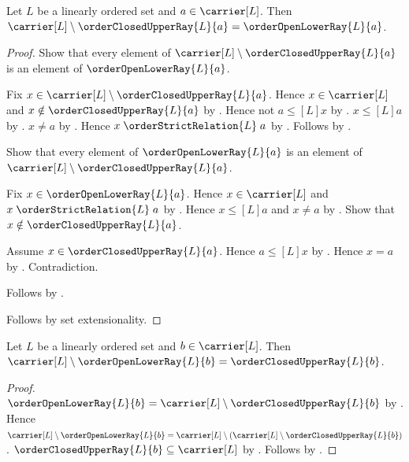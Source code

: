 \begin{proposition}\label{order_complement_closed_upper_ray}
    Let $L$ be a linearly ordered set and $a\in\carrier[L]$.
    Then $\carrier[L]\setminus\orderClosedUpperRay{L}{a}
        =\orderOpenLowerRay{L}{a}$.
\end{proposition}
\begin{proof}
    Show that every element of
        $\carrier[L]\setminus\orderClosedUpperRay{L}{a}$ is an element
        of $\orderOpenLowerRay{L}{a}$.
    \begin{subproof}
        Fix $x\in\carrier[L]\setminus\orderClosedUpperRay{L}{a}$.
        Hence $x\in\carrier[L]$ and
            $x\notin\orderClosedUpperRay{L}{a}$ by .
        Hence not $a\mathrel{\leq[L]}x$ by
            .
        $x\mathrel{\leq[L]}a$ by
            .
        $x\neq a$ by
            .
        Hence $x\mathrel{\orderStrictRelation{L}}a$ by
            .
        Follows by .
    \end{subproof}
    Show that every element of $\orderOpenLowerRay{L}{a}$ is an element
        of $\carrier[L]\setminus\orderClosedUpperRay{L}{a}$.
    \begin{subproof}
        Fix $x\in\orderOpenLowerRay{L}{a}$.
        Hence $x\in\carrier[L]$ and
            $x\mathrel{\orderStrictRelation{L}}a$ by
            .
        Hence $x\mathrel{\leq[L]}a$ and $x\neq a$ by
            .
        Show that $x\notin\orderClosedUpperRay{L}{a}$.
        \begin{subproof}
            Assume $x\in\orderClosedUpperRay{L}{a}$.
            Hence $a\mathrel{\leq[L]}x$ by
                .
            Hence $x=a$ by
                .
            Contradiction.
        \end{subproof}
        Follows by .
    \end{subproof}
    Follows by set extensionality.
\end{proof}

\begin{proposition}\label{order_complement_open_lower_ray}
    Let $L$ be a linearly ordered set and $b\in\carrier[L]$.
    Then $\carrier[L]\setminus\orderOpenLowerRay{L}{b}
        =\orderClosedUpperRay{L}{b}$.
\end{proposition}
\begin{proof}
    $\orderOpenLowerRay{L}{b}
        =\carrier[L]\setminus\orderClosedUpperRay{L}{b}$ by
        .
    Hence $\carrier[L]\setminus\orderOpenLowerRay{L}{b}
        =\carrier[L]\setminus
            (\carrier[L]\setminus\orderClosedUpperRay{L}{b})$.
    $\orderClosedUpperRay{L}{b}\subseteq\carrier[L]$ by
        .
    Follows by .
\end{proof}

